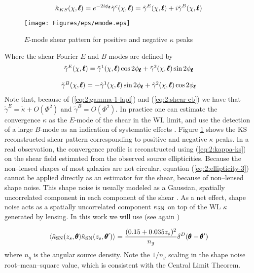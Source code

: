 \begin{equation}
\label{eq:2:kappa-ks}
\tilde{\kappa}_{KS}(\chi,\pmb{\ell}) = e^{-2i\phi_{\pmb{\ell}}} \tilde{\gamma}^c(\chi,\pmb{\ell}) = \tilde{\gamma}^E(\chi,\pmb{\ell}) + i\tilde{\gamma}^B(\chi,\pmb{\ell})
\end{equation}
%
\begin{figure}
\begin{center}
\texttt{[image: Figures/eps/emode.eps]}
\end{center}
\caption{$E$-mode shear pattern for positive and negative $\kappa$ peaks}
\label{fig:2:emode}
\end{figure}
%
Where the shear Fourier $E$ and $B$ modes are defined by
\begin{equation}
\label{eq:2:shear-eb}
\begin{matrix}
\tilde{\gamma}^E(\chi,\pmb{\ell}) =  \tilde{\gamma}^1(\chi,\pmb{\ell})\cos 2\phi_{\pmb{\ell}} +  \tilde{\gamma}^2(\chi,\pmb{\ell}) \sin 2\phi_{\pmb{\ell}}\\ \\ 
\tilde{\gamma}^B(\chi,\pmb{\ell}) = - \tilde{\gamma}^1(\chi,\pmb{\ell})\sin 2\phi_{\pmb{\ell}} + \tilde{\gamma}^2(\chi,\pmb{\ell}) \cos 2\phi_{\pmb{\ell}}
\end{matrix}
\end{equation}
%
Note that, because of (\ref{eq:2:gamma-1-lapl}) and (\ref{eq:2:shear-eb}) we have that $\tilde{\gamma}^E=\tilde{\kappa}+O(\Phi^2)$ and $\tilde{\gamma}^B=O(\Phi^2)$. In practice one can estimate the convergence $\kappa$ as the $E$-mode of the shear in the WL limit, and use the detection of a large $B$-mode as an indication of systematic effects \citep{PetriSpShear}. Figure \ref{fig:2:emode} shows the KS reconstructed shear pattern corresponding to positive and negative $\kappa$ peaks. In a real observation, the convergence profile is reconstructed using (\ref{eq:2:kappa-ks}) on the shear field estimated from the observed source ellipticities. Because the non--lensed shapes of most galaxies are not circular, equation (\ref{eq:2:ellipticity-3}) cannot be applied directly as an estimator for the shear, because of non--lensed shape noise. This shape noise is usually modeled as a Gaussian, spatially uncorrelated component in each component of the shear \citep{SongKnox}. As a net effect, shape noise acts as a spatially uncorrelated component $\kappa_{\rm SN}$ on top of the WL $\kappa$ generated by lensing. In this work we will use (see again \citep{SongKnox})

\begin{equation}
\label{eq:2:shapenoise}
\left\langle\hat{\kappa}_{\rm SN}(z_s,\pmb{\theta})\hat{\kappa}_{\rm SN}(z_s,\pmb{\theta}')\right\rangle = \frac{(0.15+0.035z_s)^2}{n_g}\delta^D(\pmb{\theta}-\pmb{\theta}')
\end{equation} 
%
where $n_g$ is the angular source density. Note the $1/n_g$ scaling in the shape noise root--mean--square value, which is consistent with the Central Limit Theorem.    

%